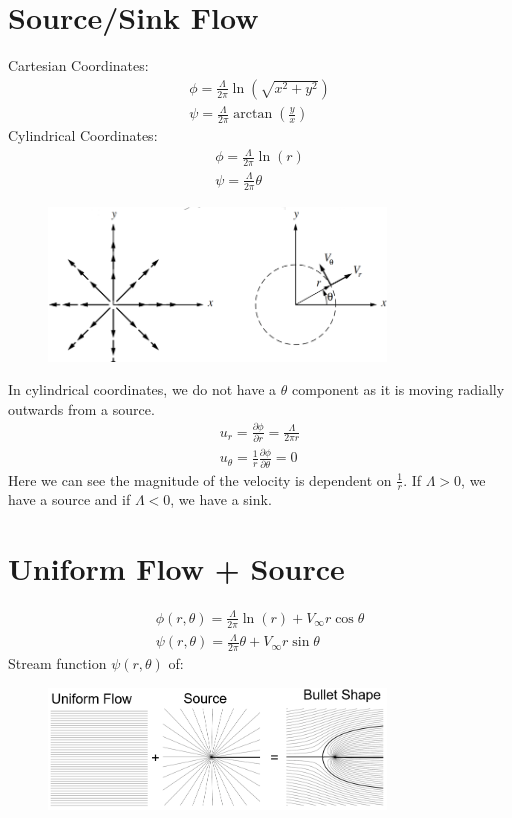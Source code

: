 \documentclass[class=report, crop=false, 12pt,a4paper]{standalone}
\begin{document}
\section{Source/Sink Flow}
Cartesian Coordinates:
\begin{gather}
  \phi = \frac{\Lambda}{2\pi} \ln(\sqrt{x^2 +y^2})\\
  \psi = \frac{\Lambda}{2\pi}\arctan\left(\frac{y}{x}\right)
\end{gather}
Cylindrical Coordinates:
\begin{gather}
  \phi = \frac{\Lambda}{2\pi}\ln(r)\\
  \psi = \frac{\Lambda}{2\pi}\theta
\end{gather}
\begin{figure}[H]
  \centering
  \includegraphics[width = 0.8\textwidth]{../img/diagram18.png}
\end{figure}
In cylindrical coordinates, we do not have a $\theta$ component as it is moving radially outwards from a source.
\begin{gather}
  u_r = \frac{\partial \phi}{\partial r} = \frac{\Lambda}{2\pi r}\\
  u_{\theta} = \frac{1}{r} \frac{\partial \phi}{\partial \theta} = 0
\end{gather}
Here we can see the magnitude of the velocity is dependent on $\frac{1}{r}$. If $\Lambda > 0$, we have a source and if $\Lambda < 0$, we have a sink.
\section{Uniform Flow + Source}
\begin{gather}
  \phi (r,\theta) = \frac{\Lambda}{2\pi} \ln(r) + V_{\infty} r \cos \theta \\
  \psi (r,\theta) = \frac{\Lambda}{2\pi}\theta + V_{\infty} r \sin \theta
\end{gather}
Stream function $\psi (r,\theta)$ of:
\begin{figure}[H]
  \centering
  \includegraphics[width = 0.8\textwidth]{../img/diagram19.png}
\end{figure}
\end{document}
